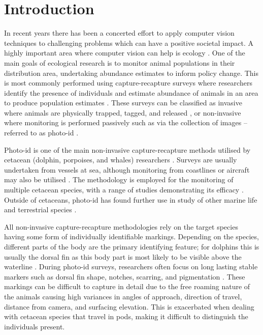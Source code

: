 \chapter{Introduction}\label{ch:intro}


In recent years there has been a concerted effort to apply computer vision techniques to challenging problems which can have a positive societal impact. A highly important area where computer vision can help is ecology \cite{weinstein_computer_2018}. One of the main goals of ecological research is to monitor animal populations in their distribution area, undertaking abundance estimates to inform policy change. This is most commonly performed using capture-recapture surveys where researchers identify the presence of individuals and estimate abundance of animals in an area to produce population estimates \cite{constantine_abundance_2012, bigg_assessment_1982, sharpe_indian_2019, van_bressem_visual_2018, arso_civil_changing_2019, cheney_long-term_2014}. These surveys can be classified as invasive where animals are physically trapped, tagged, and released \cite{norris_tagging_1970, hobbs_bowhead_1982, andrews_best_2019}, or non-invasive where monitoring is performed passively such as via the collection of images -- referred to as photo-id \cite{vanbressem_visual_2018, urian_recommendations_2015, reisser_photographic_2008, langtimm_survival_2004, holmberg_estimating_2009}.

Photo-id is one of the main non-invasive capture-recapture methods utilised by cetacean (dolphin, porpoises, and whales) researchers \cite{hammond_individual_1990, evans_monitoring_2004}. Surveys are usually undertaken from vessels at sea, although monitoring from coastlines or aircraft may also be utilised \cite{payne_long_1986, forney_seasonal_1998, wursig_methods_1990}. The methodology is employed for the monitoring of multiple cetacean species, with a range of studies demonstrating its efficacy \cite{sharpe_indian_2019, miragliuolo_rissos_2004, feyrer_origin_2021, bigg_assessment_1982}. Outside of cetaceans, photo-id has found further use in study of other marine life \cite{holmberg_estimating_2009, reisser_photographic_2008} and terrestrial species \cite{goswami_application_2007, clapham_automated_2020}.

All non-invasive capture-recapture methodologies rely on the target species having some form of individually identifiable markings. Depending on the species, different parts of the body are the primary identifying feature; for dolphins this is usually the dorsal fin as this body part is most likely to be visible above the waterline \cite{sharpe_indian_2019, baird_population_2009}. During photo-id surveys, researchers often focus on long lasting stable markers such as dorsal fin shape, notches, scarring, and pigmentation \cite{wursig_photographic_1977, lockyer_observations_1990, mann_cetacean_2000}. These markings can be difficult to capture in detail due to the free roaming nature of the animals causing high variances in angles of approach, direction of travel, distance from camera, and surfacing elevation. This is exacerbated when dealing with cetacean species that travel in pods, making it difficult to distinguish the individuals present.

